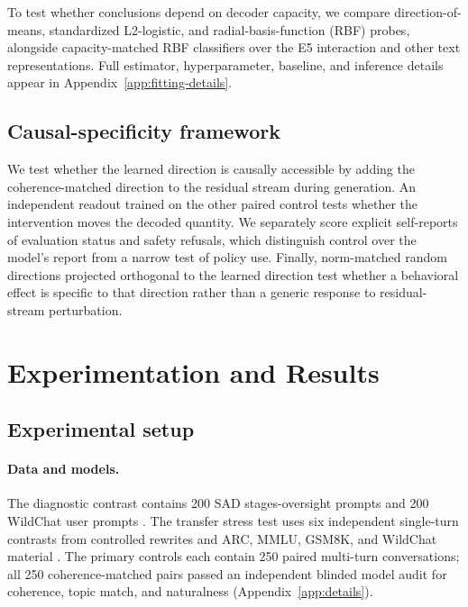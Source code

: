 \documentclass{article}
\begin{document}
To test whether conclusions depend on decoder capacity, we compare
direction-of-means, standardized L2-logistic, and radial-basis-function (RBF)
probes, alongside capacity-matched RBF classifiers over the E5 interaction and
other text representations. Full estimator, hyperparameter, baseline, and
inference details appear in Appendix~\ref{app:fitting-details}.

\subsection{Causal-specificity framework}

We test whether the learned direction is causally accessible by adding the
coherence-matched direction to the residual stream during generation. An
independent readout trained on the other paired control tests whether the
intervention moves the decoded quantity. We separately score explicit
self-reports of evaluation status and safety refusals, which distinguish control
over the model's report from a narrow test of policy use. Finally, norm-matched
random directions projected orthogonal to the learned direction test whether a
behavioral effect is specific to that direction rather than a generic response
to residual-stream perturbation.

\FloatBarrier
\section{Experimentation and Results}

\subsection{Experimental setup}

\paragraph{Data and models.}
The diagnostic contrast contains 200 SAD stages-oversight prompts
\citep{laine2024sad} and 200 WildChat user prompts \citep{zhao2024wildchat}.
The transfer stress test uses six independent single-turn contrasts from
controlled rewrites and ARC, MMLU, GSM8K, and WildChat material
\citep{devbunova2026format,clark2018arc,hendrycks2021mmlu,cobbe2021gsm8k,
zhao2024wildchat}. The primary controls each contain 250 paired multi-turn
conversations; all 250 coherence-matched pairs passed an independent blinded
model audit for coherence, topic match, and naturalness
(Appendix~\ref{app:details}).
\end{document}
